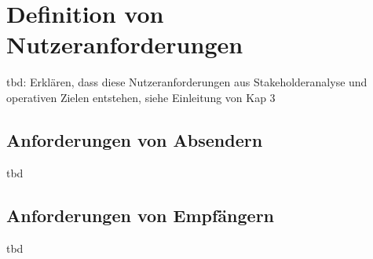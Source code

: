 
\chapter{Definition von Nutzeranforderungen}
\label{Definition_von_Nutzeranforderungen}

tbd: Erklären, dass diese Nutzeranforderungen aus Stakeholderanalyse und operativen Zielen entstehen, siehe Einleitung von Kap 3


\section{Anforderungen von Absendern}

tbd



\section{Anforderungen von Empfängern}

tbd